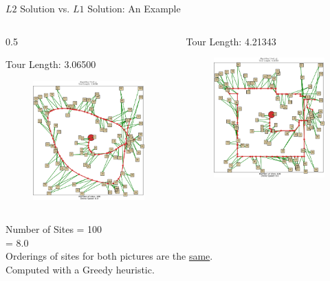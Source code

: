 \documentclass{beamer}
\begin{document}
\begin{frame}[t]{$L2$ Solution vs. $L1$ Solution: An Example}

  \vspace{-15pt}
  \begin{columns}
    \begin{column} {0.5\textwidth}
      \begin{center}
        Tour Length: 3.06500
      \end{center}
      \vspace{-20pt}
      \begin{figure}
        \includegraphics[width=5.4cm]{../img/Greedy_SLSQP.pdf}
      \end{figure}
     \end{column}

    \begin{column}{0.5\textwidth}
      \begin{center}
        Tour Length: 4.21343  
      \end{center}
      
      \vspace{-20pt}
       \begin{figure}
        \includegraphics[width=5.4cm]{../img/Greedy_LP.pdf}
      \end{figure}
     \end{column}
   \end{columns}

   \vspace{-12pt}
   \begin{center}
     Number of Sites  = 100 \\
     \varphi          = 8.0 \\
       \small {Orderings of sites for both pictures are the \underline{same}. \\ Computed with a Greedy heuristic.} \normalsize
   \end{center}
   
   
\end{frame}
\end{document}
